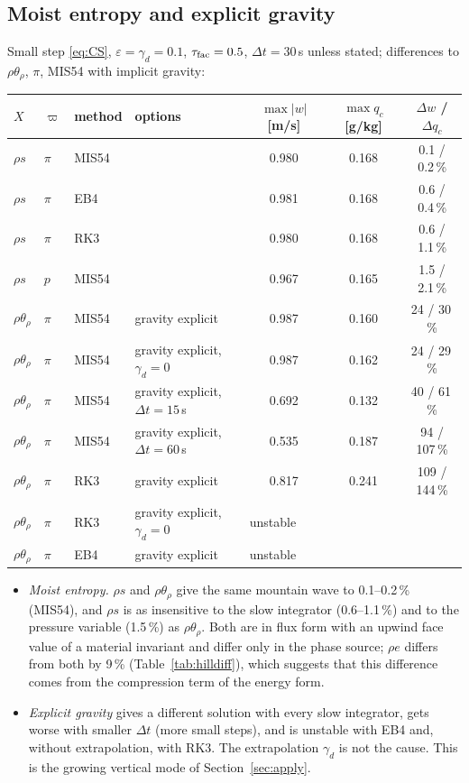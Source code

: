 \documentclass[11pt,a4paper]{article}
\newcommand{\dt}{\Delta t}
\newcommand{\pv}{\varpi}      %
\begin{document}
\subsection{Moist entropy and explicit gravity}\label{sec:hillent}
Small step \eqref{eq:CS}, $\varepsilon=\gamma_d=0.1$, $\tau_{\rm fac}=0.5$, $\dt=30$\,s unless stated; differences to $\rho\theta_\rho$, $\pi$, MIS54
with implicit gravity:
\begin{center}\small
\begin{tabular}{llllccc}\toprule
$X$ & $\pv$ & method & options & $\max|w|$ [m/s] & $\max q_c$ [g/kg] & $\Delta w$ / $\Delta q_c$\\\midrule
$\rho s$ & $\pi$ & MIS54 & & 0.980 & 0.168 & 0.1 / 0.2\,\%\\
$\rho s$ & $\pi$ & EB4 & & 0.981 & 0.168 & 0.6 / 0.4\,\%\\
$\rho s$ & $\pi$ & RK3 & & 0.980 & 0.168 & 0.6 / 1.1\,\%\\
$\rho s$ & $p$ & MIS54 & & 0.967 & 0.165 & 1.5 / 2.1\,\%\\\midrule
$\rho\theta_\rho$ & $\pi$ & MIS54 & gravity explicit & 0.987 & 0.160 & 24 / 30\,\%\\
$\rho\theta_\rho$ & $\pi$ & MIS54 & gravity explicit, $\gamma_d=0$ & 0.987 & 0.162 & 24 / 29\,\%\\
$\rho\theta_\rho$ & $\pi$ & MIS54 & gravity explicit, $\dt=15$\,s & 0.692 & 0.132 & 40 / 61\,\%\\
$\rho\theta_\rho$ & $\pi$ & MIS54 & gravity explicit, $\dt=60$\,s & 0.535 & 0.187 & 94 / 107\,\%\\
$\rho\theta_\rho$ & $\pi$ & RK3 & gravity explicit & 0.817 & 0.241 & 109 / 144\,\%\\
$\rho\theta_\rho$ & $\pi$ & RK3 & gravity explicit, $\gamma_d=0$ & \multicolumn{3}{l}{unstable}\\
$\rho\theta_\rho$ & $\pi$ & EB4 & gravity explicit & \multicolumn{3}{l}{unstable}\\\bottomrule
\end{tabular}
\end{center}
\begin{itemize}
\item \emph{Moist entropy.} $\rho s$ and $\rho\theta_\rho$ give the same mountain wave to 0.1--0.2\,\% (MIS54), and $\rho s$ is as insensitive
to the slow integrator (0.6--1.1\,\%) and to the pressure variable (1.5\,\%) as $\rho\theta_\rho$. Both are in flux form with an
upwind face value of a material invariant and differ only in the phase source; $\rho e$ differs from both by 9\,\%
(Table~\ref{tab:hilldiff}), which suggests that this difference comes from the compression term of the energy form.
\item \emph{Explicit gravity} gives a different solution with every slow integrator, gets worse with smaller $\dt$ (more small
steps), and is unstable with EB4 and, without extrapolation, with RK3. The extrapolation $\gamma_d$ is not the cause. This is the
growing vertical mode of Section~\ref{sec:apply}.
\end{itemize}
\end{document}
